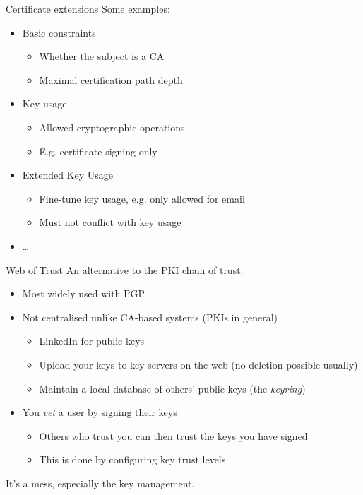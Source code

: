 \begin{frame}{Certificate extensions}
  Some examples:
  \begin{itemize}[<+(1)->]
    \item Basic constraints
    \begin{itemize}
      \item Whether the subject is a CA
      \item Maximal certification path depth
    \end{itemize}
    \item Key usage
    \begin{itemize}
      \item Allowed cryptographic operations
      \item E.g. certificate signing only
    \end{itemize}
    \item Extended Key Usage
    \begin{itemize}
      \item Fine-tune key usage, e.g. only allowed for email
      \item Must not conflict with key usage
    \end{itemize}
    \item \dots
  \end{itemize}
\end{frame}

\begin{frame}{Web of Trust}
  An alternative to the PKI chain of trust:
  \begin{itemize}[<+(1)->]
    \item Most widely used with PGP
    \item Not centralised unlike CA-based systems (PKIs in general)
    \begin{itemize}
      \item LinkedIn for public keys
      \item Upload your keys to key-servers on the web (no deletion possible usually)
      \item Maintain a local database of others' public keys (the \emph{keyring})
    \end{itemize}
    \item You \emph{vet} a user by signing their keys
    \begin{itemize}
      \item Others who trust you can then trust the keys you have signed
      \item This is done by configuring key trust levels
    \end{itemize}
  \end{itemize}

  \pause
  It's a mess, especially the key management.
\end{frame}


